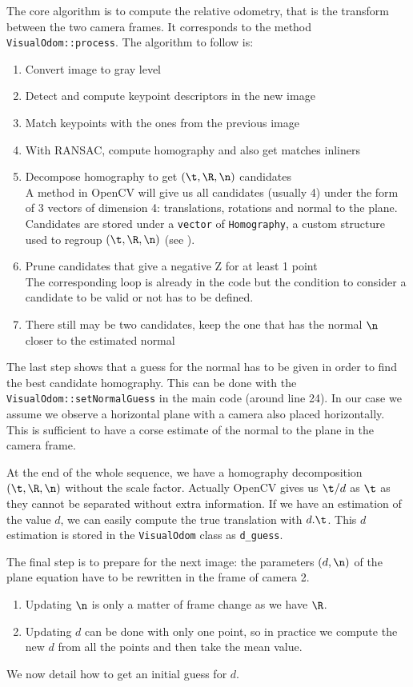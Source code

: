 \documentclass{ecnreport}
\begin{document}
The core algorithm is to compute the relative odometry, that is the transform between the two camera frames. It corresponds to the method \texttt{VisualOdom::process}.
The algorithm to follow is:
\begin{enumerate}
  \item Convert image to gray level
 \item Detect and compute keypoint descriptors in the new image
 \item Match keypoints with the ones from the previous image
 \item With RANSAC, compute homography and also get matches inliners 
 \item Decompose homography to get $(\t,\R,\n)$ candidates\\
  A method in OpenCV
will give us all candidates (usually 4) under the form of 3 vectors of dimension 4: translations, rotations and normal to the plane. Candidates 
are stored under a \texttt{vector} of \texttt{Homography}, a custom structure used to regroup $(\t,\R,\n)$ (see ).
 \item Prune candidates that give a negative Z for at least 1 point \\ The corresponding loop is already in the code but the condition to consider a candidate to be valid or not has to be defined.
 \item There still may be two candidates, keep the one that has the normal $\n$ closer to the estimated normal
\end{enumerate}
The last step shows that a guess for the normal has to be given in order to find the best candidate homography. This can be done with the \texttt{VisualOdom::setNormalGuess} in the main code (around line 24). In our case we assume
we observe a horizontal plane with a camera also placed horizontally. This is sufficient to have a corse estimate of the normal to the plane in the camera frame.

At the end of the whole sequence, we have a homography decomposition $(\t,\R,\n)$ without the scale factor. Actually OpenCV gives us $\t/d$ as $\t$ as they cannot be separated without
extra information. If we have an estimation of the value $d$, we can easily compute the true translation with $d.\t$. This $d$ estimation is stored in the \texttt{VisualOdom} class as \texttt{d\_guess}.

The final step is to prepare for the next image: the parameters $(d,\n)$ of the plane equation have to be rewritten in the frame of camera 2.
\begin{enumerate}
 \item Updating $\n$ is only a matter of frame change as we have $\R$.
 \item Updating $d$ can be done with only one point, so in practice we compute the new $d$ from all the points and then take the mean value.
\end{enumerate}
We now detail how to get an initial guess for $d$.
\end{document}

